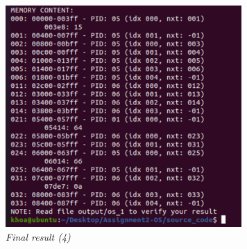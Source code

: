 \documentclass[13pt,a4paper]{article}
\begin{document}
		\begin{figure}[h!]
			\begin{center}
				\includegraphics[width=9cm]{final_4.png}
				\caption{\textit{Final result (4)}}
			\end{center}
		\end{figure}
\end{document}
